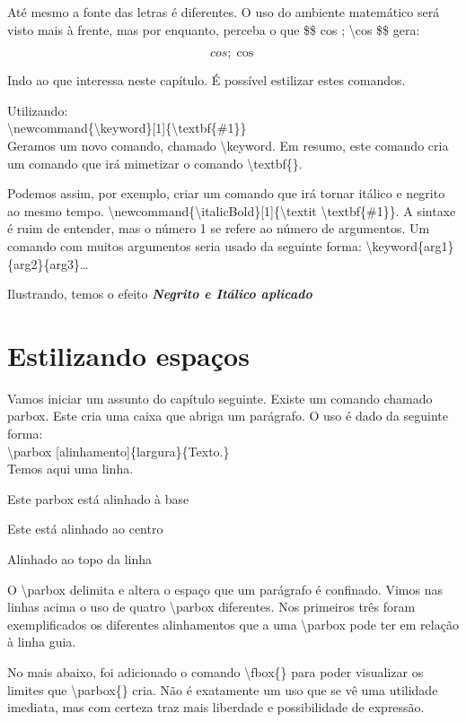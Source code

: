 Até mesmo a fonte das letras é diferentes.
O uso do ambiente matemático será visto mais à frente, mas por enquanto, perceba o que \$\$ cos ; \textbackslash cos \$\$ gera:

$$cos ; \cos$$

Indo ao que interessa neste capítulo.
É possível estilizar estes comandos.

Utilizando:\\
\indent \textbackslash newcommand\{\textbackslash keyword\}[1]\{\textbackslash textbf\{\#1\}\}\\
\indent Geramos um novo comando, chamado \textbackslash keyword.
Em resumo, este comando cria um comando que irá mimetizar o comando \textbackslash textbf\{\}.

Podemos assim, por exemplo, criar um comando que irá tornar itálico e negrito ao mesmo tempo.
\textbackslash newcommand\{\textbackslash italicBold\}[1]\{\textbackslash textit \textbackslash textbf\{\#1\}\}.
A sintaxe é ruim de entender, mas o número 1 se refere ao número de argumentos.
Um comando com muitos argumentos seria usado da seguinte forma: \textbackslash keyword\{arg1\}\{arg2\}\{arg3\}\ldots

\newcommand{\italicBold}[1]{\textit{\textbf{#1}}}
Ilustrando, temos o efeito \italicBold{Negrito e Itálico aplicado}

\section{Estilizando espaços}
Vamos iniciar um assunto do capítulo seguinte.
Existe um comando chamado parbox.
Este cria uma caixa que abriga um parágrafo.
O uso é dado da seguinte forma:\\
\textbackslash parbox [alinhamento]\{largura\}\{Texto.\}
\\

Temos aqui uma linha.
\quad\parbox[b]{2.5cm}{Este parbox está alinhado à base}
\quad\parbox{2.5cm}{Este está alinhado ao centro}
\quad\parbox[t]{2.5cm}{Alinhado ao topo da linha}


O \textbackslash parbox delimita e altera o espaço que um parágrafo é confinado.
Vimos nas linhas acima o uso de quatro \textbackslash parbox diferentes.
Nos primeiros três foram exemplificados os diferentes alinhamentos que a uma \textbackslash parbox pode ter em relação à linha guia.

No mais abaixo, foi adicionado o comando \textbackslash fbox\{\}
para poder visualizar os limites que \textbackslash parbox\{\} cria.
Não é exatamente um uso que se vê uma utilidade imediata,
mas com certeza traz mais liberdade e possibilidade de expressão.

\newpage
